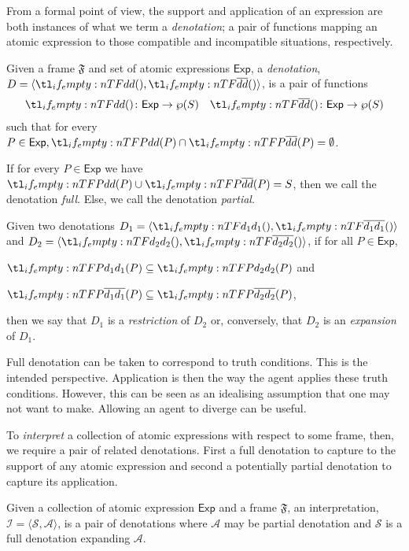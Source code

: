 \documentclass[10pt]{article}
\newcommand{\atmexp}{\ensuremath{\mathsf{Exp}}}
\newcommand{\oframe}[1]{\ensuremath{\mathfrak{#1}}}
\begin{document}
From a formal point of view, the support and application of an expression are both instances of what we term a \emph{denotation}; a pair of functions mapping an atomic expression to those compatible and incompatible situations, respectively.

\begin{definition}[Denotation]
  Given a frame \(\oframe{F}\) and set of atomic expressions \(\atmexp\), a \emph{denotation}, \(D = \langle \cdeno{},\ideno{} \rangle\), is a pair of functions
  \begin{align*}
    \cdeno{} \colon \mathsf{Exp} \to \wp(S) & & \ideno{} \colon \mathsf{Exp} \to \wp(S)
  \end{align*}
  such that for every \(P \in \mathsf{Exp}, \cdeno{P} \cap \ideno{P} = \emptyset\).

  If for every \(P \in \mathsf{Exp}\) we have \(\cdeno{P} \cup \ideno{P} = S\), then we call the denotation \emph{full}.\newline
  Else, we call the denotation \emph{partial}.
\end{definition}

Given two denotations \(D_{1} = \langle \cdeno[d_{1}]{},\ideno[d_{1}]{} \rangle\) and \(D_{2} = \langle \cdeno[d_{2}]{},\ideno[d_{2}]{} \rangle\), if for all \(P \in \mathsf{Exp}\),
\begin{enumerate*}[label=]
\item \(\cdeno[d_{1}]{P} \subseteq \cdeno[d_{2}]{P}\) and
\item \(\ideno[d_{1}]{P} \subseteq \ideno[d_{2}]{P}\),
\end{enumerate*}
then we say that \(D_{1}\) is a \emph{restriction} of \(D_{2}\) or, conversely, that \(D_{2}\) is an \emph{expansion} of \(D_{1}\).

Full denotation can be taken to correspond to truth conditions.
This is the intended perspective.
Application is then the way the agent applies these truth conditions.
However, this can be seen as an idealising assumption that one may not want to make.
Allowing an agent to diverge can be useful.





To \emph{interpret} a collection of atomic expressions with respect to some frame, then, we require a pair of related denotations.
First a full denotation to capture to the support of any atomic expression and second a potentially partial denotation to capture its application.

\begin{definition}[Interpretation]
  Given a collection of atomic expression \(\mathsf{Exp}\) and a frame \(\oframe{F}\), an interpretation, \(\mathcal{I} = \langle \mathcal{S},\mathcal{A} \rangle\), is a pair of denotations where \(\mathcal{A}\) may be partial denotation and \(\mathcal{S}\) is a full denotation expanding \(\mathcal{A}\).
\end{definition}
\end{document}
